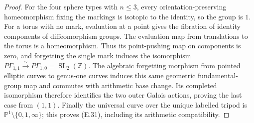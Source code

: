 \begin{proof}
For the four sphere types with $n\leq3$, every
orientation-preserving homeomorphism fixing the markings
is isotopic to the identity, so the group is $1$.
For a torus with no mark, evaluation at a point gives the
fibration of identity components of diffeomorphism groups.
The evaluation map from translations to the torus is a
homeomorphism.  Thus its point-pushing map on components
is zero, and forgetting the single mark induces the
isomorphism
$P\Gamma_{1,1}\xrightarrow{\sim}P\Gamma_{1,0}
=\operatorname{SL}_2(\mathbb Z)$.
The algebraic forgetting morphism from pointed elliptic
curves to genus-one curves induces this same geometric
fundamental-group map and commutes with arithmetic base
change.  Its completed isomorphism therefore identifies
the two outer Galois actions, proving the last case from
$(1,1)$.  Finally the universal curve over the unique
labelled tripod is $\mathbb P^1\setminus\{0,1,\infty\}$;
this proves (E.31), including its arithmetic compatibility.
\end{proof}


